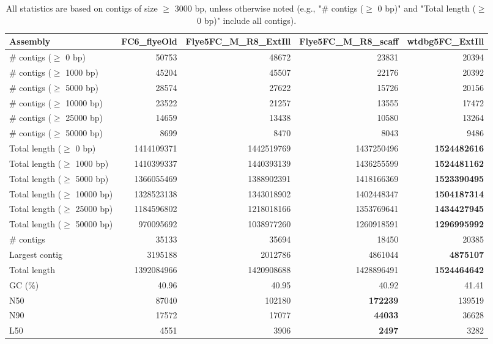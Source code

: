 \documentclass[12pt,a4paper]{article}
\begin{document}
\begin{table}[ht]
\begin{center}
\caption{All statistics are based on contigs of size $\geq$ 3000 bp, unless otherwise noted (e.g., "\# contigs ($\geq$ 0 bp)" and "Total length ($\geq$ 0 bp)" include all contigs).}
\begin{tabular}{|l*{4}{|r}|}
\hline
Assembly & FC6\_flyeOld & Flye5FC\_M\_R8\_ExtIll & Flye5FC\_M\_R8\_scaff & wtdbg5FC\_ExtIll \\ \hline
\# contigs ($\geq$ 0 bp) & 50753 & 48672 & 23831 & 20394 \\ \hline
\# contigs ($\geq$ 1000 bp) & 45204 & 45507 & 22176 & 20392 \\ \hline
\# contigs ($\geq$ 5000 bp) & 28574 & 27622 & 15726 & 20156 \\ \hline
\# contigs ($\geq$ 10000 bp) & 23522 & 21257 & 13555 & 17472 \\ \hline
\# contigs ($\geq$ 25000 bp) & 14659 & 13438 & 10580 & 13264 \\ \hline
\# contigs ($\geq$ 50000 bp) & 8699 & 8470 & 8043 & 9486 \\ \hline
Total length ($\geq$ 0 bp) & 1414109371 & 1442519769 & 1437250496 & {\bf 1524482616} \\ \hline
Total length ($\geq$ 1000 bp) & 1410399337 & 1440393139 & 1436255599 & {\bf 1524481162} \\ \hline
Total length ($\geq$ 5000 bp) & 1366055469 & 1388902391 & 1418166369 & {\bf 1523390495} \\ \hline
Total length ($\geq$ 10000 bp) & 1328523138 & 1343018902 & 1402448347 & {\bf 1504187314} \\ \hline
Total length ($\geq$ 25000 bp) & 1184596802 & 1218018166 & 1353769641 & {\bf 1434427945} \\ \hline
Total length ($\geq$ 50000 bp) & 970095692 & 1038977260 & 1260918591 & {\bf 1296995992} \\ \hline
\# contigs & 35133 & 35694 & 18450 & 20385 \\ \hline
Largest contig & 3195188 & 2012786 & 4861044 & {\bf 4875107} \\ \hline
Total length & 1392084966 & 1420908688 & 1428896491 & {\bf 1524464642} \\ \hline
GC (\%) & 40.96 & 40.95 & 40.92 & 41.41 \\ \hline
N50 & 87040 & 102180 & {\bf 172239} & 139519 \\ \hline
N90 & 17572 & 17077 & {\bf 44033} & 36628 \\ \hline
L50 & 4551 & 3906 & {\bf 2497} & 3282 \\ \hline

\end{tabular}
\end{center}
\end{table}
\end{document}
